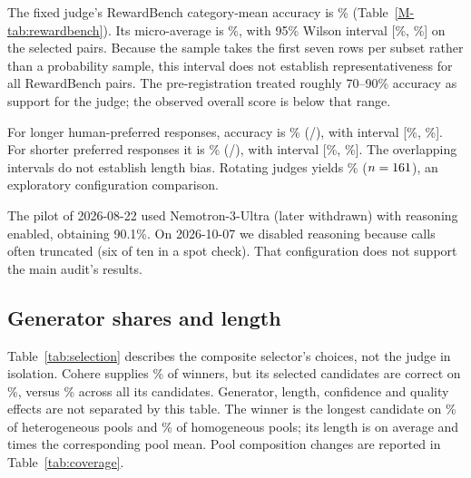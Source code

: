 The fixed judge's RewardBench category-mean accuracy is \RBOverallAcc\%
(Table~\ref{M-tab:rewardbench}).
Its micro-average is \RBMicroAcc\%, with 95\% Wilson interval
[\RBCILow\%, \RBCIHigh\%] on the selected \RBN{} pairs. Because the
sample takes the first seven rows per subset rather than a probability
sample, this interval does not establish representativeness for all
RewardBench pairs. The pre-registration treated roughly 70--90\% accuracy
as support for the judge; the observed overall score is below that range.

For longer human-preferred responses, accuracy is \RBChosenLongerAcc\%
(\RBChosenLongerK/\RBChosenLongerN{}), with interval
[\RBChosenLongerCILow\%, \RBChosenLongerCIHigh\%].
For shorter preferred responses it is \RBRejectedLongerAcc\%
(\RBRejectedLongerK/\RBRejectedLongerN{}), with interval
[\RBRejectedLongerCILow\%, \RBRejectedLongerCIHigh\%]. The overlapping
intervals do not establish length bias. Rotating judges yields
\RBXOverallAcc\% ($n=161$), an exploratory configuration comparison.

The pilot of 2026-08-22 used Nemotron-3-Ultra (later withdrawn) with
reasoning enabled, obtaining 90.1\%. On 2026-10-07 we disabled reasoning
because calls often truncated (six of ten in a spot check).
That configuration does not support the main audit's results.

\subsection{Generator shares and length}
\label{sec:generator-diagnostics}

Table~\ref{tab:selection} describes the composite selector's choices,
not the judge in isolation. Cohere supplies \PickShareCohere\% of winners,
but its selected candidates are correct on \PickAccCohere\%, versus
\CandAccCohere\% across all its candidates. Generator, length, confidence
and quality effects are not separated by this table. The winner is the
longest candidate on \LongestPickHetPct\% of heterogeneous pools and
\LongestPickHomPct\% of homogeneous pools; its length is on average
\WinnerLenRatioHet{} and \WinnerLenRatioHom{} times the corresponding
pool mean. Pool composition changes are reported in Table~\ref{tab:coverage}.

\begin{table}[htbp]
\centering
\caption{Generator composition and OR-Select picks over \SelectionRows{}
heterogeneous problems. Accuracy and pick share are percentages.}
\label{tab:selection}
\small
{}
\end{table}

